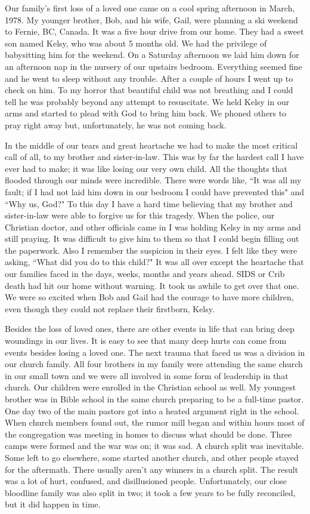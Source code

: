 \documentclass[oneside,12pt]{book}
\begin{document}
Our family's first loss of a loved one came on a cool spring afternoon in March, 1978. My  younger brother, Bob, and his wife, Gail, were planning a ski weekend to Fernie, BC, Canada. It was a five hour drive from our home. They had a sweet son named Kelsy, who was about 5 months old. We had the privilege of babysitting him for the weekend. On a Saturday afternoon we laid him down for an afternoon nap in the nursery of our upstairs bedroom. Everything seemed fine and he went to sleep without any trouble. After a couple of hours I went up to check on him. To my horror that beautiful child was not breathing and I could tell he was probably beyond any attempt to resuscitate. We held Kelsy in our arms and started to plead with God to bring him back. We phoned others to pray right away but, unfortunately, he was not coming back. 

In the middle of our tears and great heartache we had to make the most critical call of all, to my brother and sister-in-law. This was by far the hardest call I have ever had to make; it was like losing our very own child. All the thoughts that flooded through our minds were incredible. There were words like, ``It was all my fault; if I had not laid him down in our bedroom I could have prevented this" and ``Why us, God?" To this day I have a hard time believing that my brother and sister-in-law were able to forgive us for this tragedy. When the police, our Christian doctor, and other officials came in I was holding Kelsy in my arms and still praying. It was difficult to give him to them so that I could begin filling out the paperwork. Also I remember the suspicion in their eyes. I felt like they were asking, ``What did you do to this child?" It was all over except the heartache that our families faced in the days, weeks, months and years ahead. SIDS or Crib death had hit our home without warning. It took us awhile to get over that one. We were so excited when Bob and Gail had the courage to have more children, even though they could not replace their firstborn, Kelsy.

Besides the loss of loved ones, there are other events in life that can bring deep woundings in our lives. It is easy to see that many deep hurts can come from events besides losing a loved one. The next trauma that faced us was a division in our church family. All four brothers in my family were attending the same church in our small town and we were all involved in some form of leadership in that church. Our children were enrolled in the Christian school as well. My youngest brother was in Bible school in the same church preparing to be a full-time pastor. One day two of the main pastors got into a heated argument right in the school. When church members found out, the rumor mill began and within hours most of the congregation was meeting in homes to discuss what should be done. Three camps were formed and the war was on; it was sad. A church split was inevitable. Some left to go elsewhere, some started another church, and other people stayed for the aftermath. There usually aren't any winners in a church split. The result was a lot of hurt, confused, and disillusioned people. Unfortunately, our close bloodline family was also split in two; it took a few years to be fully reconciled, but it did happen in time. 
\end{document}
